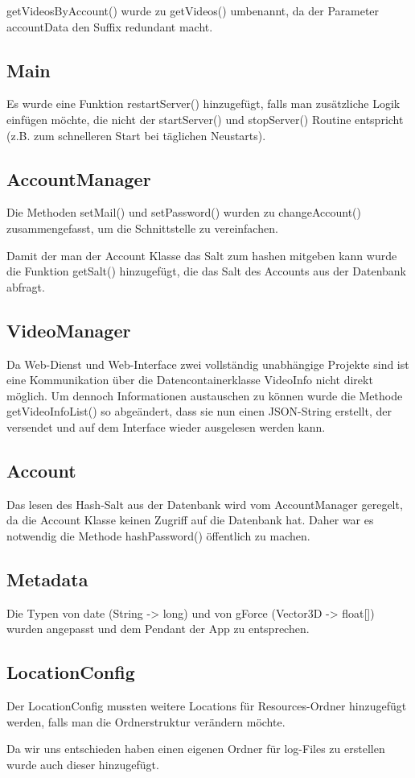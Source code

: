 getVideosByAccount() wurde zu getVideos() umbenannt, da der Parameter accountData den Suffix redundant macht.

\subsection{Main}
Es wurde eine Funktion restartServer() hinzugefügt, falls man zusätzliche Logik einfügen möchte, die nicht der startServer() und stopServer() Routine entspricht (z.B. zum schnelleren Start bei täglichen Neustarts).

\subsection{AccountManager}
Die Methoden setMail() und setPassword() wurden zu changeAccount() zusammengefasst, um die Schnittstelle zu vereinfachen.  \par  

Damit der man der Account Klasse das Salt zum hashen mitgeben kann wurde die Funktion getSalt() hinzugefügt, die das Salt des Accounts aus der Datenbank abfragt.

\subsection{VideoManager} \label{sec:VideoManager}
Da Web-Dienst und Web-Interface zwei vollständig unabhängige Projekte sind ist eine Kommunikation über die Datencontainerklasse VideoInfo nicht direkt möglich. Um dennoch Informationen austauschen zu können wurde die Methode getVideoInfoList() so abgeändert, dass sie nun einen JSON-String erstellt, der versendet und auf dem Interface wieder ausgelesen werden kann.

\subsection{Account}
Das lesen des Hash-Salt aus der Datenbank wird vom AccountManager geregelt, da die Account Klasse keinen Zugriff auf die Datenbank hat. Daher war es notwendig die Methode hashPassword() öffentlich zu machen.

\subsection{Metadata}
Die Typen von date (String -> long) und von gForce (Vector3D -> float[]) wurden angepasst und dem Pendant der App zu entsprechen.

\subsection{LocationConfig}
Der LocationConfig mussten weitere Locations für Resources-Ordner hinzugefügt werden, falls man die Ordnerstruktur verändern möchte. \par
Da wir uns entschieden haben einen eigenen Ordner für log-Files zu erstellen wurde auch dieser hinzugefügt.

